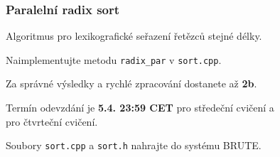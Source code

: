 \documentclass[usenames,dvipsnames,9pt]{beamer}
\begin{document}
 \begin{frame}
   \frametitle{Paralelní radix sort}
   
   Algoritmus pro lexikografické seřazení řetězců stejné délky.
   
      \vspace{1.5em}
   
   Naimplementujte metodu \texttt{radix\_par} v \texttt{sort.cpp}.%
  
  
   \vspace{1.5em}
  
   Za správné výsledky a rychlé zpracování dostanete až {\bf 2b}.
  
    \vspace{1.5em}
    
   \begin{tabbing}
   Termín odevzdání je \={\bf 5.4. 23:59 CET} pro středeční cvičení a\\
    pro čtvrteční cvičení.
 \end{tabbing}

 Soubory \texttt{sort.cpp} a \texttt{sort.h}  nahrajte do systému BRUTE.
  

 \end{frame}


\framefeedback{}
\end{document}
